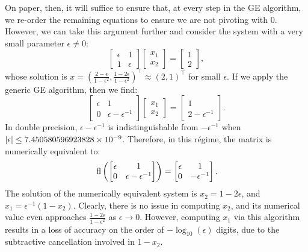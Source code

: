 On paper, then, it will suffice to ensure that, at every step in the GE algorithm, we re-order the remaining equations to ensure we are not pivoting with $0$. However, we can take this argument further and consider the system with a very small parameter $\epsilon\ne0$:
\begin{equation}\label{eq:badGEeps}
\begin{bmatrix} \epsilon & 1\\ 1 & \epsilon\end{bmatrix}\begin{bmatrix}x_1\\x_2\end{bmatrix} = \begin{bmatrix} 1\\2\end{bmatrix},
\end{equation}
whose solution is $x = \left(\tfrac{2-\epsilon}{1-\epsilon^2},\tfrac{1-2\epsilon}{1-\epsilon^2}\right)^\top \approx (2,1)^\top$ for small $\epsilon$. If we apply the generic GE algorithm, then we find:
\begin{equation}
\begin{bmatrix} \epsilon & 1\\ 0 & \epsilon-\epsilon^{-1}\end{bmatrix}\begin{bmatrix}x_1\\x_2\end{bmatrix} = \begin{bmatrix} 1\\2-\epsilon^{-1}\end{bmatrix}.
\end{equation}
In double precision, $\epsilon-\epsilon^{-1}$ is indistinguishable from $-\epsilon^{-1}$ when $\left|{\epsilon}\right|\le 7.450580596923828\times10^{-9}$. Therefore, in this r\'egime, the matrix is numerically equivalent to:
\begin{equation}
{\rm\,fl}\left(\begin{bmatrix} \epsilon & 1\\ 0 & \epsilon-\epsilon^{-1}\end{bmatrix}\right) = \begin{bmatrix} \epsilon & 1\\ 0 & -\epsilon^{-1}\end{bmatrix}.
\end{equation}
The solution of the numerically equivalent system is $x_2 = 1-2\epsilon$, and $x_1 = \epsilon^{-1}(1-x_2)$. Clearly, there is no issue in computing $x_2$, and its numerical value even approaches $\tfrac{1-2\epsilon}{1-\epsilon^2}$ as $\epsilon\to0$. However, computing $x_1$ via this algorithm results in a loss of accuracy on the order of $-\log_{10}(\epsilon)$ digits, due to the subtractive cancellation involved in $1-x_2$.

